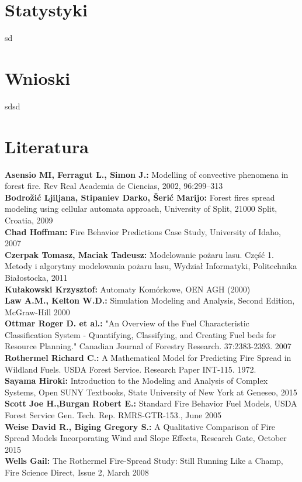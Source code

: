 \documentclass[a4paper, 11pt]{article}
\begin{document}
	\section*{Statystyki}
	\indent
	sd
	\section{Wnioski}
	\indent
	
	sdsd
	\section{Literatura}
	
	\textbf{Asensio MI, Ferragut L., Simon J.:} Modelling of convective phenomena in forest fire. Rev Real Academia de Ciencias, 2002, 96:299–313\\
	\textbf{Bodrožić Ljiljana, Stipaniev Darko, Šerić Marijo:} Forest fires spread modeling using cellular automata approach, University of Split, 21000 Split, Croatia, 2009 \\
	\textbf{Chad Hoffman:} Fire Behavior Predictions Case Study, University of Idaho, 2007\\
	\textbf{Czerpak Tomasz, Maciak Tadeusz:} Modelowanie pożaru lasu. Część 1. Metody i algorytmy modelowania pożaru lasu, Wydział Informatyki, Politechnika Białostocka, 2011 \\
	\textbf{Kułakowski Krzysztof:} Automaty Komórkowe, OEN AGH (2000) \\
	\textbf{Law A.M., Kelton W.D.:} Simulation Modeling and Analysis, Second Edition, McGraw-Hill 2000\\
	\textbf{Ottmar Roger D. et al.:} "An Overview of the Fuel Characteristic Classification System - Quantifying, Classifying, and Creating Fuel beds for Resource Planning." Canadian Journal of Forestry Research. 37:2383-2393. 2007\\
	\textbf{Rothermel Richard C.:} A Mathematical Model for Predicting Fire Spread in Wildland Fuels. USDA Forest Service. Research Paper INT-115. 1972.\\
	\textbf{Sayama Hiroki:} Introduction to the Modeling and Analysis of Complex Systems, Open SUNY Textbooks, State University of New York at Geneseo, 2015\\	
	\textbf{Scott Joe H.,Burgan Robert E.:} Standard Fire Behavior Fuel Models, USDA Forest Service Gen. Tech. Rep. RMRS-GTR-153., June 2005\\	
	\textbf{Weise David R., Biging Gregory S.:} A Qualitative Comparison of Fire Spread Models Incorporating Wind and Slope Effects, Research Gate, October 2015\\
	\textbf{Wells Gail:} The Rothermel Fire-Spread Study: Still Running Like a Champ, Fire Science Direct, Issue 2, March 2008\\
	
	
	
	
\end{document}
